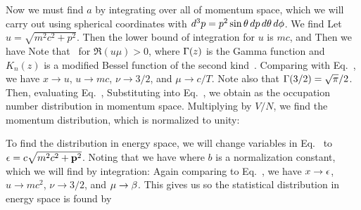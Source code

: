{	Now we must find $a$ by integrating over all of momentum space, which we will carry out  using spherical coordinates with $\dd[3]{p} = p^2 \sin\theta \dd{p} \dd{\theta} \dd{\phi}$.  We find
	Let $u = \sqrt{m^2 c^2 + p^2}$.  Then the lower bound of integration for $u$ is $m c$, and
	Then we have
	Note that~\cite[p.~351]{Integrals}
	for $\Re(u \mu) > 0$, where $\Gamma(z)$ is the Gamma function and $K_n(z)$ is a modified Bessel function of the second kind~\cite[p.~175]{Pathria}.  Comparing with Eq.~, we have $x \to u$, $u \to mc$, $\nu \to 3/2$, and $\mu \to c/T$.  Note also that $\Gamma(3/2) = \sqrt{\pi} / 2$.  Then, evaluating Eq.~,
	Substituting into Eq.~, we obtain
	as the occupation number distribution in momentum space.  Multiplying by $V / N$, we find the momentum distribution, which is normalized to unity:
	
	To find the distribution in energy space, we will change variables in Eq.~ to $\epsilon = c \sqrt{m^2 c^2 + \vb{p}^2}$.  Noting that
	we have
	where $b$ is a normalization constant, which we will find by integration:
	Again comparing to Eq.~, we have $x \to \epsilon$, $u \to mc^2$, $\nu \to 3/2$, and $\mu \to \beta$.  This gives us
	so the statistical distribution in energy space is found by

}
